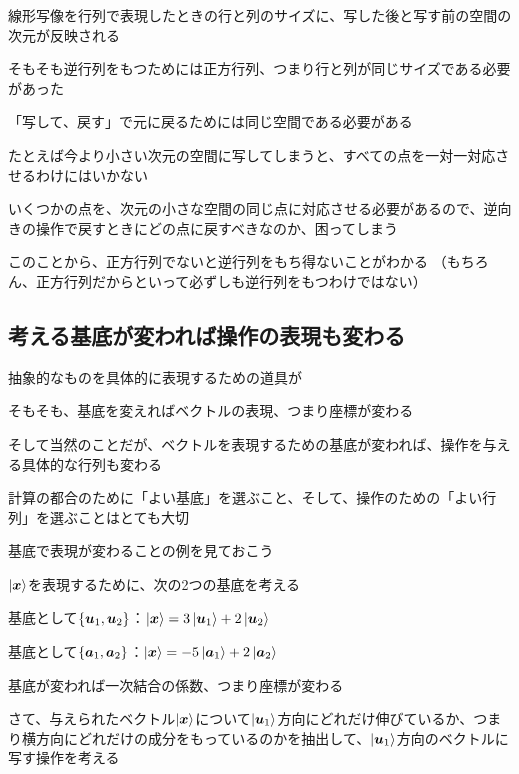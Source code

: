 \documentclass[../book_half_step_linear]{subfiles}
\begin{document}
線形写像を行列で表現したときの行と列のサイズに、写した後と写す前の空間の次元が反映される

\sectionline

そもそも逆行列をもつためには正方行列、つまり行と列が同じサイズである必要があった

「写して、戻す」で元に戻るためには同じ空間である必要がある

\br

たとえば今より小さい次元の空間に写してしまうと、すべての点を一対一対応させるわけにはいかない

いくつかの点を、次元の小さな空間の同じ点に対応させる必要があるので、逆向きの操作で戻すときにどの点に戻すべきなのか、困ってしまう

\br

このことから、正方行列でないと逆行列をもち得ないことがわかる
（もちろん、正方行列だからといって必ずしも逆行列をもつわけではない）

\sectionline
\subsection{考える基底が変われば操作の表現も変わる}

抽象的なものを具体的に表現するための道具が

そもそも、基底を変えればベクトルの表現、つまり座標が変わる

そして当然のことだが、ベクトルを表現するための基底が変われば、操作を与える具体的な行列も変わる

計算の都合のために「よい基底」を選ぶこと、そして、操作のための「よい行列」を選ぶことはとても大切

\sectionline

基底で表現が変わることの例を見ておこう

$\ket{\vb*{x}}$を表現するために、次の2つの基底を考える
\begin{enumerate}[label={[\arabic*]}]
  \item 基底として$\{ \vb*{u}_1, \vb*{u}_2 \}$：$\ket{\vb*{x}} = 3\ket{\vb*{u}_1} + 2\ket{\vb*{u}_2}$
  \item 基底として$\{ \vb*{a}_1, \vb*{a}_2 \}$：$\ket{\vb*{x}} = -5\ket{\vb*{a}_1} + 2\ket{\vb*{a}_2}$
\end{enumerate}
基底が変われば一次結合の係数、つまり座標が変わる

\br

さて、与えられたベクトル$\ket{\vb*{x}}$について$\ket{\vb*{u}_1}$方向にどれだけ伸びているか、つまり横方向にどれだけの成分をもっているのかを抽出して、$\ket{\vb*{u}_1}$方向のベクトルに写す操作を考える
\end{document}
